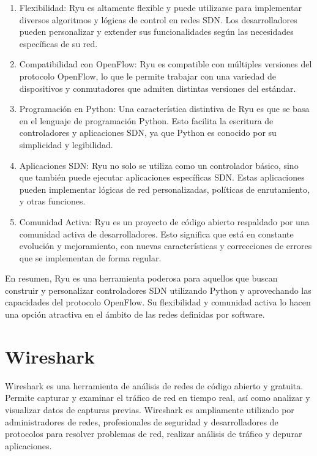 \documentclass[a4paper, 12pt]{book}
\begin{document}
	\begin{enumerate}
		
		\item Flexibilidad: Ryu es altamente flexible y puede utilizarse para implementar diversos algoritmos y lógicas de control en redes SDN. Los desarrolladores pueden personalizar y extender sus funcionalidades según las necesidades específicas de su red.
	
		\item Compatibilidad con OpenFlow: Ryu es compatible con múltiples versiones del protocolo OpenFlow, lo que le permite trabajar con una variedad de dispositivos y conmutadores que admiten distintas versiones del estándar.
	
		\item Programación en Python: Una característica distintiva de Ryu es que se basa en el lenguaje de programación Python. Esto facilita la escritura de controladores y aplicaciones SDN, ya que Python es conocido por su simplicidad y legibilidad.
	
		\item Aplicaciones SDN: Ryu no solo se utiliza como un controlador básico, sino que también puede ejecutar aplicaciones específicas SDN. Estas aplicaciones pueden implementar lógicas de red personalizadas, políticas de enrutamiento, y otras funciones.
	
		\item Comunidad Activa: Ryu es un proyecto de código abierto respaldado por una comunidad activa de desarrolladores. Esto significa que está en constante evolución y mejoramiento, con nuevas características y correcciones de errores que se implementan de forma regular.
		
	\end{enumerate}
	
	En resumen, Ryu es una herramienta poderosa para aquellos que buscan construir y personalizar controladores SDN utilizando Python y aprovechando las capacidades del protocolo OpenFlow. Su flexibilidad y comunidad activa lo hacen una opción atractiva en el ámbito de las redes definidas por software.
	
	\section{Wireshark} 
	\label{sec:wireshark}
	
	Wireshark es una herramienta de análisis de redes de código abierto y gratuita. Permite capturar y examinar el tráfico de red en tiempo real, así como analizar y visualizar datos de capturas previas. Wireshark es ampliamente utilizado por administradores de redes, profesionales de seguridad y desarrolladores de protocolos para resolver problemas de red, realizar análisis de tráfico y depurar aplicaciones.
	
\end{document}
